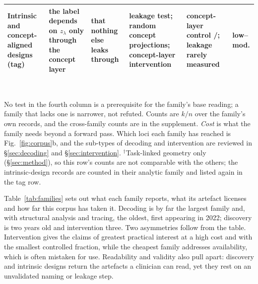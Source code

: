 \begin{table}[!tb]
\begin{tabular}{@{}L{2.2cm}L{3.0cm}L{2.5cm}L{3.0cm}L{3.1cm}L{1.4cm}@{}}
\midrule
\textbf{Intrinsic and concept-aligned designs} (tag) & the label depends on $z_\lambda$ only through the concept layer & that nothing else leaks through & leakage test; random concept projections; concept-layer intervention & concept-layer control \Vintrany{}/\Vintrn{}; leakage rarely measured & low--mod. \\
\bottomrule
\end{tabular}
\\[3pt]
\begin{minipage}{\textwidth}\footnotesize
No test in the fourth column is a prerequisite for the family's base reading; a family that lacks one is
narrower, not refuted. Counts are $k/n$ over the family's own records, and the cross-family counts are in
the supplement. \emph{Cost} is what the family needs beyond a forward pass. Which loci each family has
reached is Fig.~\ref{fig:corpus}b, and the sub-types of decoding and intervention are reviewed in
\S\ref{sec:decoding} and \S\ref{sec:intervention}. $^{\dagger}$Task-linked geometry only
(\S\ref{sec:method}), so this row's counts are not comparable with the others; the \Nintrinsic{}
intrinsic-design records are counted in their analytic family and listed again in the tag row.
\end{minipage}
\end{table}

Table~\ref{tab:families} sets out what each family reports, what its artefact licenses and how far this
corpus has taken it. Decoding is by far the largest family and, with structural analysis and tracing, the
oldest, first appearing in 2022; discovery is two years old and intervention three. Two asymmetries
follow from the table. Intervention gives the claims of greatest practical interest at a high cost and
with the smallest controlled fraction, while the cheapest family addresses availability, which is often
mistaken for use. Readability and validity also pull apart: discovery and intrinsic designs return the
artefacts a clinician can read, yet they rest on an unvalidated naming or leakage step.

